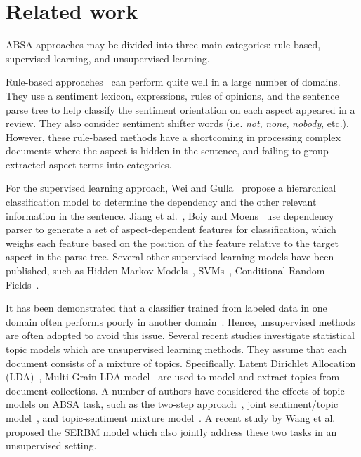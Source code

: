\section{Related work} \label{related-work}

ABSA approaches may be divided into three main categories: rule-based, supervised learning, and unsupervised learning.

Rule-based approaches~\cite{bingliu,Ding} can perform quite well in a large number of domains.
They use a sentiment lexicon, expressions, rules of opinions, and the sentence parse tree to help classify the sentiment orientation on each aspect appeared in a review.
They also consider sentiment shifter words (i.e. \textit{not}, \textit{none}, \textit{nobody}, etc.).
However, these rule-based methods have a shortcoming in processing complex documents where the aspect is hidden in the sentence, and failing to group extracted aspect terms into categories.

For the supervised learning approach, Wei and Gulla~\cite{Wei_Gulla} propose a hierarchical classification model to determine the dependency and the other relevant information in the sentence.
Jiang et al.~\cite{Jiang}, Boiy and Moens~\cite{Boiy} use dependency parser to generate a set of aspect-dependent features for classification, which weighs each feature based on the position of the feature relative to the target aspect in the parse tree.
Several other supervised learning models have been published, such as Hidden Markov Models~\cite{Jin_Wei}, SVMs~\cite{ABSA_SVM}, Conditional Random Fields~\cite{Choi_Yejin,Jakob_Iryna}.

It has been demonstrated that a classifier trained from labeled data in one domain often performs poorly in another domain~\cite{BingLiubooks}.
Hence, unsupervised methods are often adopted to avoid this issue.
Several recent studies investigate statistical topic models which are unsupervised learning methods.
They assume that each document consists of a mixture of topics.
Specifically, Latent Dirichlet Allocation (LDA)~\cite{LDA_Blei}, Multi-Grain LDA model~\cite{Titov_Ryan} are used to model and extract topics from document collections.
A number of authors have considered the effects of topic models on ABSA task, such as the two-step approach~\cite{Brody_Elhadad}, joint sentiment/topic model~\cite{Lin_He}, and topic-sentiment mixture model~\cite{Mei}.
A recent study by Wang et al.~\cite{serbm} proposed the SERBM model which also jointly address these two tasks in an unsupervised setting.



